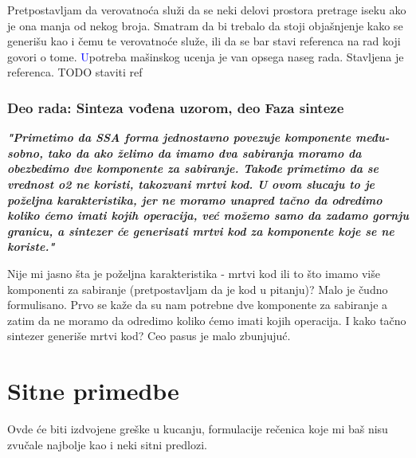 \documentclass[a4paper]{report}
\newcommand{\odgovor}[1]{\textcolor{blue}{#1}}
\begin{document}
Pretpostavljam da verovatnoća služi da se neki delovi prostora pretrage iseku ako je ona manja od nekog broja. Smatram da bi trebalo da stoji objašnjenje kako se generišu kao i čemu te verovatnoće služe, ili da se bar stavi referenca na rad koji govori o tome.
\odgovor Upotreba mašinskog ucenja je van opsega naseg rada. Stavljena je referenca. TODO staviti ref

\subsubsection{Deo rada: Sinteza vođena uzorom, deo Faza sinteze}
\textbf{\textit{"Primetimo da SSA forma jednostavno povezuje komponente među-sobno, tako da ako želimo da imamo dva sabiranja moramo da obezbedimo dve komponente za sabiranje. Takođe primetimo da se vrednost o2 ne koristi, takozvani mrtvi kod. U ovom slucaju to je poželjna karakteristika,
jer ne moramo unapred tačno da odredimo koliko ćemo imati kojih operacija, već možemo samo da zadamo gornju granicu, a sintezer će generisati mrtvi kod za komponente koje se ne koriste."}}

Nije mi jasno šta je poželjna karakteristika - mrtvi kod ili to što imamo više komponenti za sabiranje (pretpostavljam da je kod u pitanju)? Malo je čudno formulisano. Prvo se kaže da su nam potrebne dve komponente za sabiranje a zatim da ne moramo da odredimo koliko ćemo imati kojih operacija. I kako tačno sintezer generiše mrtvi kod? Ceo pasus je malo zbunjujuć.



\section{Sitne primedbe}
Ovde će biti izdvojene greške u kucanju, formulacije rečenica koje mi baš nisu zvučale najbolje kao i neki sitni predlozi.
\end{document}
